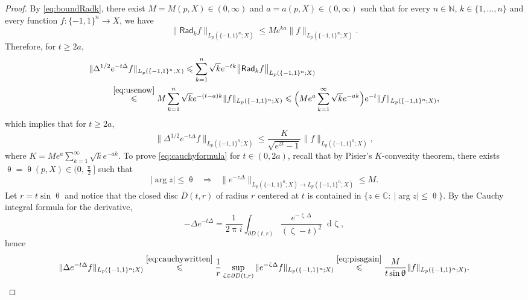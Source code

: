 \documentclass[11pt,reqno]{amsart}
\renewcommand{\leq}{\leqslant}
\renewcommand{\geq}{\geqslant}
\renewcommand{\pi}{\uppi}
\newcommand{\1}{\mathbf 1}
\theoremstyle{remark}
\newcommand{\C}{\mathbb C}
\newcommand{\N}{\mathbb N}
\renewcommand{\theta}{\uptheta}
\renewcommand{\pi}{\uppi}
\renewcommand{\pi}{\uppi}
\renewcommand{\zeta}{\upzeta}
\newcommand*\diff{\mathop{}\!\mathrm{d}}
\newcommand{\msf}{\mathsf}
\begin{document}
\begin{proof}
By \eqref{eq:boundRadk}, there exist $M=M(p,X)\in(0,\infty)$ and $a=a(p,X)\in(0,\infty)$ such that for every $n\in\N$, $k\in\{1,\ldots,n\}$ and every function $f:\{-1,1\}^n\to X$, we have
\begin{equation} \label{eq:usenow}
\big\|\msf{Rad}_kf\big\|_{L_p(\{-1,1\}^n;X)} \leq M e^{ka} \|f\|_{L_p(\{-1,1\}^n;X)}.
\end{equation}
Therefore, for $t\geq 2a$,
\begin{equation}
\begin{split}
\|\Delta^{1/2}& e^{-t\Delta} f\|_{L_p(\{-1,1\}^n;X)}  \leq \sum_{k=1}^n \sqrt{k} e^{-tk}\big\|\msf{Rad}_kf\big\|_{L_p(\{-1,1\}^n;X)}
\\ & \stackrel{\eqref{eq:usenow}}{\leq} M \sum_{k=1}^n \sqrt{k} e^{-(t-a)k} \|f\|_{L_p(\{-1,1\}^n;X)} \leq \Big(Me^a \sum_{k=1}^\infty \sqrt{k} e^{-ak}\Big) e^{-t} \|f\|_{L_p(\{-1,1\}^n;X)},
\end{split}
\end{equation}
which implies that for $t\geq 2a$,
\begin{equation}
 \|\Delta^{1/2} e^{-t\Delta}f\|_{L_p(\{-1,1\}^n;X)} \leq \frac{K}{\sqrt{e^{2t}-1}} \|f\|_{L_p(\{-1,1\}^n;X)},
\end{equation}
where $K=Me^a \sum_{k=1}^\infty \sqrt{k} e^{-ak}$. To prove \eqref{eq:cauchyformula} for $t\in(0,2a)$, recall that by Pisier's $K$-convexity theorem, there exists $\theta=\theta(p,X)\in\big(0,\frac{\pi}{2}\big]$ such that
\begin{equation} \label{eq:pisagain}
|\arg z|\leq \theta \ \ \ \Longrightarrow \ \ \ \|e^{-z\Delta}\|_{{L_p(\{-1,1\}^n;X)}\to {L_p(\{-1,1\}^n;X)}} \leq M.
\end{equation}
Let $r = t\sin\theta$ and notice that the closed disc $\overline{D}(t,r)$ of radius $r$ centered at $t$ is contained in $\{z\in\C: \ |\arg z|\leq\theta\}$. By the Cauchy integral formula for the derivative,
\begin{equation} \label{eq:cauchywritten}
-\Delta e^{-t\Delta} = \frac{1}{2\pi i} \int_{\partial D(t,r)} \frac{e^{-\zeta \Delta}}{(\zeta-t)^2}\diff \zeta,
\end{equation}
hence
\begin{equation} \label{eq:boundDetD}
\begin{split}
\|\Delta e^{-t\Delta}f\|_{L_p(\{-1,1\}^n;X)} \stackrel{\eqref{eq:cauchywritten}}{\leq} \frac{1}{r} \sup_{\zeta \in \partial D(t,r)} \|e^{-\zeta\Delta}f\|_{L_p(\{-1,1\}^n;X)} \stackrel{\eqref{eq:pisagain}}{\leq} \frac{M}{t\sin\theta} \|f\|_{L_p(\{-1,1\}^n;X)}.

\end{split}
\end{equation}
\end{proof}
\end{document}

